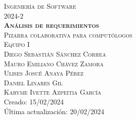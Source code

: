 \thispagestyle{empty}

\begin{center}
    \textsc{\LARGE   Ingeniería de Software \\[5mm]
                    \LARGE 2024-2}      \\[20mm]
    
    \textsc{\textbf{\huge   Análisis de requerimientos}}\\[5mm]
    \textsc{\LARGE  Pizarra colaborativa para computólogos}\\[20mm]

    \LARGE
    \textsc{Equipo I}\\[5mm]
    \Large 
    \textsc{Diego Sebastián Sánchez Correa}\\[2mm]
    \textsc{Mauro Emiliano Chávez Zamora}\\[2mm]
    \textsc{Ulises Josué Anaya Pérez}\\[2mm]
    \textsc{Daniel Linares Gil} \\[2mm]
    \textsc{Karyme Ivette Azpeitia García}
    \\[20mm]

    \large Creado: 15/02/2024\\[2mm]
    \large Última actualización: 20/02/2024\\
    
\end{center}	
\newpage  

